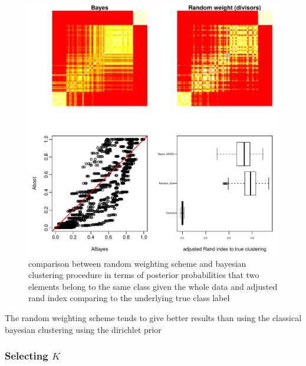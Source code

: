 \documentclass[aoas,preprint]{imsart}
\begin{document}
\begin{figure}[h!]
\includegraphics[scale = 1]{Figs/try7-g.pdf}
 \caption{comparison between random weighting scheme and bayesian clustering procedure in terms of posterior probabilities that two elements belong to the same class given the whole data and adjusted rand index comparing to the underlying true class label}
  \label{fig:1}
\end{figure}

The random weighting scheme tends to give better results than using the classical bayesian clustering using the dirichlet prior


\subsubsection{Selecting $K$}
\end{document}
